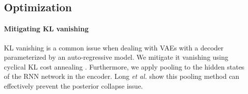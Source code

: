 
% 

\newpage
\subsection{Optimization}

\paragraph{Mitigating KL vanishing}
KL vanishing is a common issue when dealing with VAEs with a decoder parameterized by an auto-regressive model.
We mitigate it vanishing using cyclical KL cost annealing \cite{fu2019cyclical}. Furthermore, we apply pooling to the hidden states of the RNN network in the encoder. Long \textit{et al.} \cite{long2019preventing} show this pooling method can effectively prevent the posterior collapse issue. 

